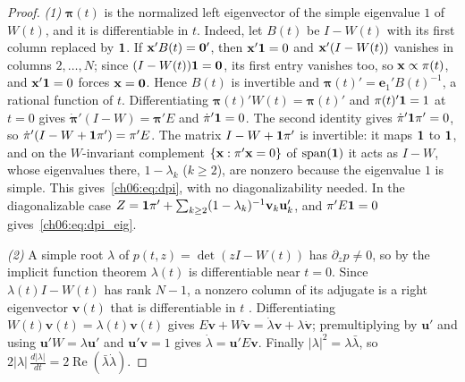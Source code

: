 \documentclass[../structural_economics_book.tex]{subfiles}
\begin{document}
\begin{proof}
\textit{(1)} $\boldsymbol{\pi}(t)$ is the normalized left eigenvector of the simple eigenvalue $1$ of $W(t)$, and it is differentiable in $t$. Indeed, let $B(t)$ be $I - W(t)$ with its first column replaced by $\mathbf{1}$. If $\mathbf{x}'B(t) = \mathbf{0}'$, then $\mathbf{x}'\mathbf{1} = 0$ and $\mathbf{x}'(I - W(t))$ vanishes in columns $2, \ldots, N$; since $(I - W(t))\mathbf{1} = \mathbf{0}$, its first entry vanishes too, so $\mathbf{x} \propto \pi(t)$, and $\mathbf{x}'\mathbf{1} = 0$ forces $\mathbf{x} = \mathbf{0}$. Hence $B(t)$ is invertible and $\boldsymbol{\pi}(t)' = \mathbf{e}_1'B(t)^{-1}$, a rational function of $t$. Differentiating $\boldsymbol{\pi}(t)'W(t) = \boldsymbol{\pi}(t)'$ and $\pi(t)'\mathbf{1} = 1$ at $t = 0$ gives $\dot{\boldsymbol{\pi}}'(I - W) = \boldsymbol{\pi}'E$ and $\dot{\pi}'\mathbf{1} = 0$. The second identity gives $\dot{\pi}'\mathbf{1}\pi' = 0$, so $\dot{\pi}'(I - W + \mathbf{1}\pi') = \pi'E$. The matrix $I - W + \mathbf{1}\pi'$ is invertible: it maps $\mathbf{1}$ to $\mathbf{1}$, and on the $W$-invariant complement $\{\mathbf{x} : \pi'\mathbf{x} = 0\}$ of $\operatorname{span}(\mathbf{1})$ it acts as $I - W$, whose eigenvalues there, $1 - \lambda_k$ ($k \geq 2$), are nonzero because the eigenvalue $1$ is simple. This gives~\eqref{ch06:eq:dpi}, with no diagonalizability needed. In the diagonalizable case $Z = \mathbf{1}\pi' + \sum_{k \geq 2}(1-\lambda_k)^{-1}\mathbf{v}_k\mathbf{u}_k'$, and $\pi'E\mathbf{1} = 0$ gives~\eqref{ch06:eq:dpi_eig}.

\textit{(2)} A simple root $\lambda$ of $p(t, z) = \det(zI - W(t))$ has $\partial_z p \neq 0$, so by the implicit function theorem $\lambda(t)$ is differentiable near $t = 0$. Since $\lambda(t)I - W(t)$ has rank $N - 1$, a nonzero column of its adjugate is a right eigenvector $\mathbf{v}(t)$ that is differentiable in $t$ \citep[cf.][Sec.~6.3]{horn2012matrix}. Differentiating $W(t)\mathbf{v}(t) = \lambda(t)\mathbf{v}(t)$ gives $E\mathbf{v} + W\dot{\mathbf{v}} = \dot\lambda\mathbf{v} + \lambda\dot{\mathbf{v}}$; premultiplying by $\mathbf{u}'$ and using $\mathbf{u}'W = \lambda\mathbf{u}'$ and $\mathbf{u}'\mathbf{v} = 1$ gives $\dot\lambda = \mathbf{u}'E\mathbf{v}$. Finally $|\lambda|^2 = \lambda\bar\lambda$, so $2|\lambda|\,\tfrac{d|\lambda|}{dt} = 2\operatorname{Re}(\bar\lambda\dot\lambda)$.
\end{proof}
\end{document}
